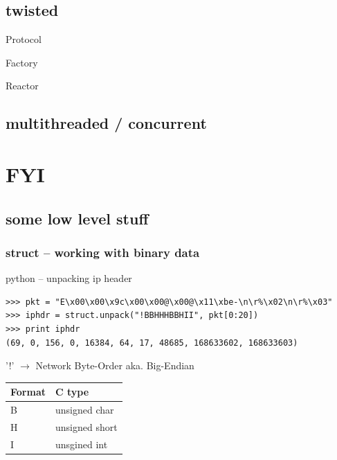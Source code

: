 \documentclass{beamer}
\begin{document}
\subsection*{twisted}	%
\begin{frame}
	\begin{block}{Protocol}
	\begin{itemize}
	\end{itemize}
	\end{block}

	\begin{block}{Factory}
	\begin{itemize}
	\end{itemize}
	\end{block}

	\begin{block}{Reactor}
	\begin{itemize}
	\end{itemize}
	\end{block}

\end{frame}

\subsection*{multithreaded / concurrent}	%


\section{FYI}

\subsection*{some low level stuff}	%

\begin{frame}[fragile]
	\frametitle{struct -- working with binary data}
	\begin{exampleblock}{python -- unpacking ip header}
	\begin{lstlisting}
>>> pkt = "E\x00\x00\x9c\x00\x00@\x00@\x11\xbe-\n\r%\x02\n\r%\x03"
>>> iphdr = struct.unpack("!BBHHHBBHII", pkt[0:20])
>>> print iphdr
(69, 0, 156, 0, 16384, 64, 17, 48685, 168633602, 168633603)
	\end{lstlisting}
	\end{exampleblock}
	'!' $\rightarrow$ Network Byte-Order aka. Big-Endian\\[0.4cm]
	\begin{tabular}{|l|l|}	
	Format & C type\\
	\hline
	B & unsigned char\\
	H & unsigned short\\
	I & unsgined int\\	
	\end{tabular}
\end{frame}
\end{document}
